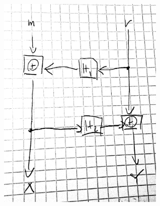 \documentclass[answers, a4paper, 11pt]{exam}
\begin{document}
\begin{questions}
\begin{parts}
\begin{solution}
\includegraphics[width=0.6\textwidth]{oaep}

\end{solution}

\end{parts}
\end{questions}
\end{document}
